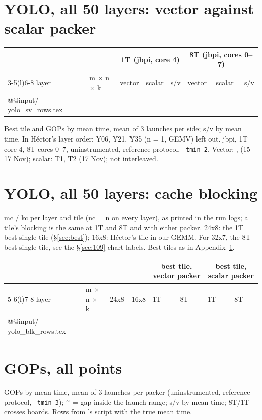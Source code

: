\section{YOLO, all 50 layers: vector against scalar packer}\label{app:yolo}
{\footnotesize\setlength\tabcolsep{3pt}
\begin{longtable}{@{}l l ll r ll r@{}}
\toprule
 & & \multicolumn{3}{c}{1T (jbpi, core 4)} & \multicolumn{3}{c}{8T (jbpi, cores 0--7)} \\
\cmidrule(lr){3-5}\cmidrule(l){6-8}
layer & m $\times$ n $\times$ k & vector & scalar & s/v & vector & scalar & s/v \\
\midrule\endhead
\csname @@input\endcsname \G/yolo_sv_rows.tex
\bottomrule
\end{longtable}}
\noindent Best tile and GOPs by mean time, mean of 3 launches per side; s/v by mean time. In H\'ector's layer order; Y06, Y21, Y35 (n = 1, GEMV) left out. jbpi, 1T core 4, 8T cores 0--7, uninstrumented, reference protocol, \texttt{--tmin 2}. Vector: ,  (15--17 Nov); scalar:  T1, T2 (17 Nov); not interleaved.

\section{YOLO, all 50 layers: cache blocking}\label{app:blk}
mc / kc per layer and tile (nc = n on every layer), as printed in the run logs; a tile's blocking is the same at 1T and 8T and with either packer. 24x8: the 1T best single tile (\S\ref{sec:best}); 16x8: H\'ector's tile in our GEMM. For 32x7, the 8T best single tile, see the \S\ref{sec:109} chart labels. Best tiles as in Appendix~\ref{app:yolo}.
{\footnotesize\setlength\tabcolsep{4pt}
\begin{longtable}{@{}l l rr ll ll@{}}
\toprule
 & & & & \multicolumn{2}{c}{best tile, vector packer} & \multicolumn{2}{c}{best tile, scalar packer} \\
\cmidrule(lr){5-6}\cmidrule(l){7-8}
layer & m $\times$ n $\times$ k & 24x8 & 16x8 & 1T & 8T & 1T & 8T \\
\midrule\endhead
\csname @@input\endcsname \G/yolo_blk_rows.tex
\bottomrule
\end{longtable}}

\section{ GOPs, all points}\label{app:85}
GOPs by mean time, mean of 3 launches per packer (uninstrumented, reference protocol, \texttt{--tmin 3}); $^{\sim}$ = gap inside the launch range; s/v by mean time; 8T/1T crosses boards. Rows from 's script with the true mean time.
